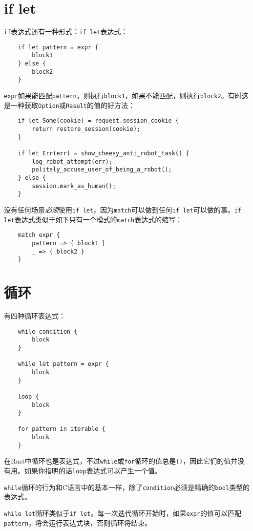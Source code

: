 \section{if let}

\texttt{if}表达式还有一种形式：\texttt{if let}表达式：
\begin{verbatim}
    if let pattern = expr {
        block1
    } else {
        block2
    }
\end{verbatim}

\texttt{expr}如果能匹配\texttt{pattern}，则执行\texttt{block1}，如果不能匹配，则执行\texttt{block2}。有时这是一种获取\texttt{Option}或\texttt{Result}的值的好方法：
\begin{verbatim}
    if let Some(cookie) = request.session_cookie {
        return restore_session(cookie);
    }

    if let Err(err) = show_cheesy_anti_robot_task() {
        log_robot_attempt(err);
        politely_accuse_user_of_being_a_robot();
    } else {
        session.mark_as_human();
    }
\end{verbatim}

没有任何场景\emph{必须}使用\texttt{if let}，因为\texttt{match}可以做到任何\texttt{if let}可以做的事。\texttt{if let}表达式类似于如下只有一个模式的\texttt{match}表达式的缩写：
\begin{verbatim}
    match expr {
        pattern => { block1 }
        _ => { block2 }
    }
\end{verbatim}

\section{循环}

有四种循环表达式：
\begin{verbatim}
    while condition {
        block
    }
    
    while let pattern = expr {
        block
    }

    loop {
        block
    }

    for pattern in iterable {
        block
    }
\end{verbatim}

在Rust中循环也是表达式，不过\texttt{while}或\texttt{for}循环的值总是\texttt{()}，因此它们的值并没有用。如果你指明的话\texttt{loop}表达式可以产生一个值。

\texttt{while}循环的行为和C语言中的基本一样，除了\texttt{condition}必须是精确的\texttt{bool}类型的表达式。

\texttt{while let}循环类似于\texttt{if let}。每一次迭代循环开始时，如果\texttt{expr}的值可以匹配\texttt{pattern}，将会运行表达式块，否则循环将结束。

